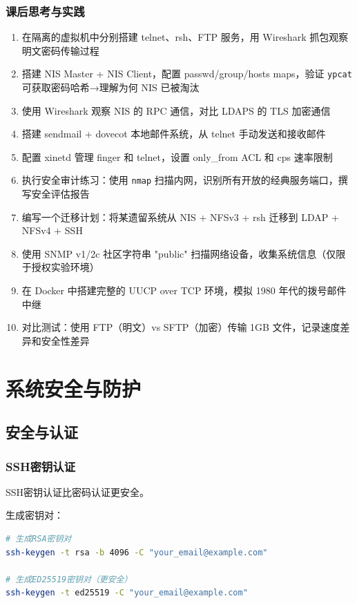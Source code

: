 \documentclass[12pt,UTF8]{ctexbook}
\begin{document}
\section{课后思考与实践}
\label{sec:legacy-services-practice}
\begin{enumerate}
    \item 在隔离的虚拟机中分别搭建 telnet、rsh、FTP 服务，用 Wireshark 抓包观察明文密码传输过程
    \item 搭建 NIS Master + NIS Client，配置 passwd/group/hosts maps，验证 \texttt{ypcat} 可获取密码哈希→理解为何 NIS 已被淘汰
    \item 使用 Wireshark 观察 NIS 的 RPC 通信，对比 LDAPS 的 TLS 加密通信
    \item 搭建 sendmail + dovecot 本地邮件系统，从 telnet 手动发送和接收邮件
    \item 配置 xinetd 管理 finger 和 telnet，设置 only\_from ACL 和 cps 速率限制
    \item 执行安全审计练习：使用 \texttt{nmap} 扫描内网，识别所有开放的经典服务端口，撰写安全评估报告
    \item 编写一个迁移计划：将某遗留系统从 NIS + NFSv3 + rsh 迁移到 LDAP + NFSv4 + SSH
    \item 使用 SNMP v1/2c 社区字符串 "public" 扫描网络设备，收集系统信息（仅限于授权实验环境）
    \item 在 Docker 中搭建完整的 UUCP over TCP 环境，模拟 1980 年代的拨号邮件中继
    \item 对比测试：使用 FTP（明文）vs SFTP（加密）传输 1GB 文件，记录速度差异和安全性差异
\end{enumerate}

\part{系统安全与防护}

\chapter{安全与认证}
\label{chap:security-auth}

\section{SSH密钥认证}
\label{sec:ssh-key-auth}

SSH密钥认证比密码认证更安全。

生成密钥对：
\begin{lstlisting}[language=bash]
# 生成RSA密钥对
ssh-keygen -t rsa -b 4096 -C "your_email@example.com"

# 生成ED25519密钥对（更安全）
ssh-keygen -t ed25519 -C "your_email@example.com"
\end{lstlisting}
\end{document}
